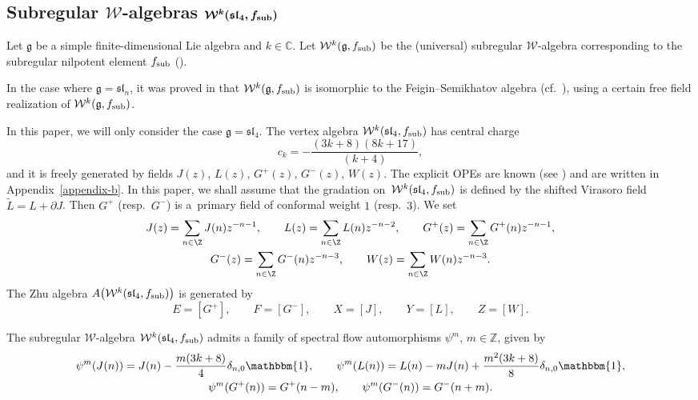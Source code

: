 \subsection[Subregular W-algebras W\^{}k(sl\_4, f\_sub]{Subregular $\boldsymbol{\mathcal{W}}$-algebras $\boldsymbol{\mathcal{W}^k(\mathfrak{sl}_4, f_{\rm sub})}$}	\label{subreg_ope}

Let $\mathfrak{g}$ be a simple finite-dimensional Lie algebra and $k \in \mathbb{C}$. Let $\mathcal{W}^k(\mathfrak{g}, f_{\rm sub})$ be the (universal) subregular $\mathcal{W}$-algebra corresponding to the subregular nilpotent element $f_{\rm sub}$ (\cite{KW}).

In the case where $\mathfrak g = \mathfrak{sl}_n$, it was proved in \cite{Gen} that $\mathcal{W}^k(\mathfrak{g}, f_{\rm sub})$ is isomorphic to the Feigin--Semikhatov algebra  (cf.\ \cite{FS}), using a certain free field realization of $\mathcal{W}^k(\mathfrak{g}, f_{\rm sub})$.

In this paper, we will only consider the case $\mathfrak g = \mathfrak{sl}_4$. The vertex algebra $\mathcal{W}^{k}(\mathfrak{sl}_4, f_{\rm sub})$ has central charge
\[
c_k = -\frac{(3k+8)(8k+17)}{(k+4) },
\]
 and it is freely generated by fields $J(z)$, $L(z)$, $G^+ (z)$, $G^- (z)$, $W(z)$. The explicit OPEs are known (see \cite{CL18,FS}) and are written in Appendix~\ref{appendix-b}. In this paper, we shall assume that the gradation on~$\mathcal{W}^{k}(\mathfrak{sl}_4, f_{\rm sub})$ is defined by the shifted Virasoro field $\widetilde L = L + \partial J$. Then $G^+$ (resp.~$G^-$) is a~primary field of conformal weight $1$ (resp.~$3$). We set
\begin{gather*}
J(z) = \sum _{n \in {\Z}} J(n) z^{-n-1}, \qquad L(z) = \sum _{n \in {\Z}} L(n) z^{-n-2}, \qquad G^+ (z) = \sum _{n \in {\Z}} G^+(n) z^{-n-1}, \\ G^- (z) = \sum _{n \in {\Z}} G^-(n) z^{-n-3}, \qquad W (z) = \sum _{n \in {\Z}} W(n) z^{-n-3}.
\end{gather*}	
The Zhu algebra $A\bigl(\mathcal{W}^{k}(\mathfrak{sl}_4, f_{\rm sub})\bigr)$ is generated by
\[
 E=[G^+],\qquad F=[G^- ], \qquad X=[J ], \qquad Y =[L], \qquad Z=[W].
 \]

The subregular $\mathcal{W}$-algebra $\mathcal{W}^k(\mathfrak{sl}_4, f_{\rm sub})$ admits a family of spectral flow automorphisms $\psi^m$, $m \in \mathbb{Z}$, given by
\begin{gather*}
 \psi^m (J(n)) = J(n)- { \frac{m (3 k +8)}{4} }
	 \delta _{n,0}\mathbbm{1} , \qquad \psi^m ( L(n)) = L(n) - mJ(n) + \frac{m^2 { (3k+8)}}{{8} }\delta _{n,0}\mathbbm{1}, \\
 \psi^m (G^+(n)) = G^+(n-m), \qquad \psi^m (G^-(n)) = G^-(n+m).
 \end{gather*}

